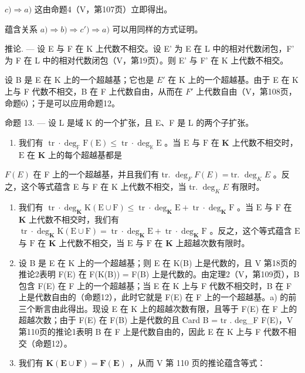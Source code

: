 \(c) \Rightarrow a)\) 这由命题4（V，第107页）立即得出。

蕴含关系 \(a) \Rightarrow b) \Rightarrow c') \Rightarrow a)\) 可以用同样的方式证明。

推论. --- 设 E 与 F 在 K 上代数不相交。设 E' 为 E 在 L 中的相对代数闭包，F' 为 F 在 L 中的相对代数闭包（V，第19页）。则 E' 与 F' 在 K 上代数不相交。

设 B 是 E 在 K 上的一个超越基；它也是 \(E'\) 在 K 上的一个超越基。由于 E 在 K 上与 F 代数不相交，B 在 F 上代数自由，从而在 \(F'\) 上代数自由（V，第108页，命题6）；于是可以应用命题12。

命题 13. --- 设 L 是域 K 的一个扩张，且 E、F 是 L 的两个子扩张。

\begin{enumerate}
\def\labelenumi{\alph{enumi})}
\tightlist
\item
  我们有 \(\operatorname{tr} \cdot \deg_{\mathbb{F}} \mathrm{F}(\mathrm{E}) \leqslant \operatorname{tr} \cdot \deg_{\mathbb{K}} \mathrm{E}\) 。当 \(\mathrm{E}\) 与 \(\mathrm{F}\) 在 \(\mathbf{K}\) 上代数不相交时， \(\mathrm{E}\) 在 \(\mathbf{K}\) 上的每个超越基都是
\end{enumerate}

\(F(E)\) 在 F 上的一个超越基，并且我们有 tr. \(\deg_{F}F(E) = \text{tr. } \deg_{K}E\) 。反之，这个等式蕴含 E 与 F 在 K 上代数不相交，当 tr. \(\deg_{K}E\) 有限时。

\begin{enumerate}
\def\labelenumi{\alph{enumi})}
\setcounter{enumi}{1}
\item
  我们有 \(\operatorname{tr} \cdot \deg_{\mathbf{K}} \mathrm{K}(\mathrm{E} \cup \mathrm{F}) \leqslant \operatorname{tr} \cdot \deg_{\mathbf{K}} \mathrm{E} + \operatorname{tr} \cdot \deg_{\mathbf{K}} \mathrm{F}\) 。当 \(\mathrm{E}\) 与 \(\mathrm{F}\) 在 \(\mathbf{K}\) 上代数不相交时，我们有 \(\operatorname{tr} \cdot \deg_{\mathbf{K}} \mathrm{K}(\mathrm{E} \cup \mathrm{F}) = \operatorname{tr} \cdot \deg_{\mathbf{K}} \mathrm{E} + \operatorname{tr} \cdot \deg_{\mathbf{K}} \mathrm{F}\) 。反之，这个等式蕴含 \(\mathrm{E}\) 与 \(\mathrm{F}\) 在 \(\mathbf{K}\) 上代数不相交，当 \(\mathrm{E}\) 与 \(\mathrm{F}\) 在 \(\mathbf{K}\) 上超越次数有限时。
\item
  设 B 是 E 在 K 上的一个超越基；则 E 在 K(B) 上是代数的，且 V 第18页的推论2表明 F(E) 在 F(K(B)) = F(B) 上是代数的。由定理2（V，第109页），B 包含 F(E) 在 F 上的一个超越基；当 E 在 K 上与 F 代数不相交时，B 在 F 上是代数自由的（命题12），此时它就是 F(E) 在 F 上的一个超越基。a) 的前三个断言由此得出。现设 E 在 K 上的超越次数有限，且等于 F(E) 在 F 上的超越次数；由于 F(E) 在 F(B) 上是代数的且 Card B = tr . deg\_F F(E)，V 第110页的推论1表明 B 在 F 上是代数自由的，因此 E 在 K 上与 F 代数不相交（命题12）。
\item
  我们有 \(\mathbf{K}(\mathbf{E} \cup \mathbf{F}) = \mathbf{F}(\mathbf{E})\) ，从而 V 第 110 页的推论蕴含等式：
\end{enumerate}

